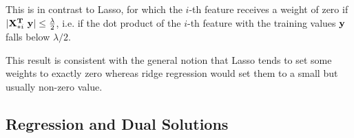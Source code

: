 \begin{enumerate}
\begin{mdframed}
This is in contrast to Lasso, for which the $i$-th feature receives a weight of
zero if $|\mathbf X_{*i}^{\mathbf{T}} ~\mathbf y| \leq \frac{\lambda}{2}$, i.e. if the dot product of
the $i$-th feature with the training values $\mathbf y$ falls below $\lambda/2$.

This result is consistent with the general notion that Lasso tends to set some
weights to exactly zero whereas ridge regression would set them to a small but
usually non-zero value.
\end{mdframed}

\end{enumerate}


\newpage


\subsection{Regression and Dual Solutions}


